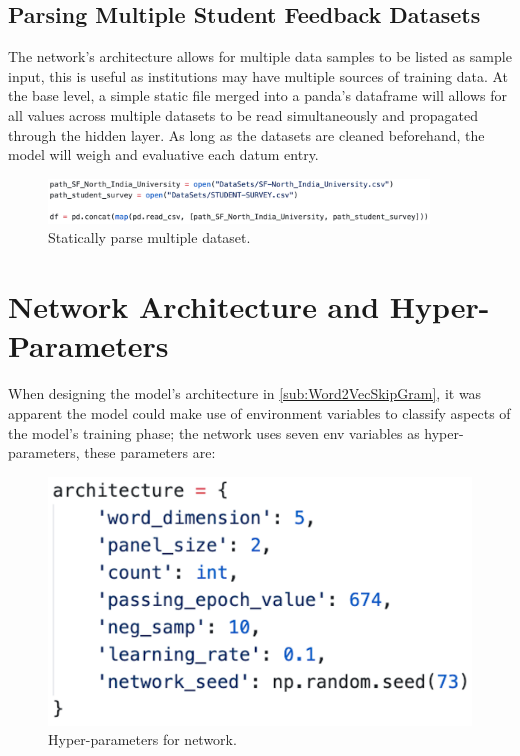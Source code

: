 \subsection{Parsing Multiple Student Feedback Datasets}

The network's architecture allows for multiple data samples to be listed as sample input, this is useful as institutions may have multiple sources of training data. At the base level, a simple static file merged into a panda's dataframe will allows for all values across multiple datasets to be read simultaneously and propagated through the hidden layer. As long as the datasets are cleaned beforehand, the model will weigh and evaluative each datum entry.

\begin{figure}[H]
    \centering
    \includegraphics[width=0.9\textwidth]{figures/chapter-6/parse_multiple_dataframes.png}
    \caption[Statically parse multiple dataset]{Statically parse multiple dataset.
    \label{fig:parse_multiple_dataframes}}
\end{figure}

\section{Network Architecture and Hyper-Parameters}

When designing the model's architecture in \autoref{sub:Word2VecSkipGram}, it was apparent the model could make use of environment variables to classify aspects of the model's training phase; the network uses seven env variables as hyper-parameters, these parameters are:

\begin{figure}[H]
    \centering
    \includegraphics[width=\textwidth]{figures/chapter-6/network_architecture.png}
    \caption[Hyper-parameters for network]{Hyper-parameters for network.
    \label{fig:network_Hyper_parameters}}
\end{figure}

